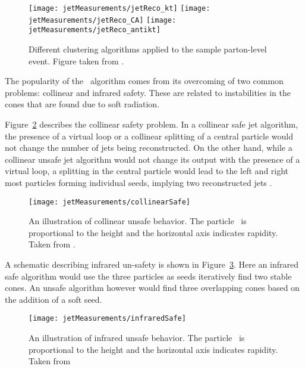 \begin{figure}[htp]
\centering
\texttt{[image: jetMeasurements/jetReco\_kt]}\hfill
\texttt{[image: jetMeasurements/jetReco\_CA]}\hfill
\texttt{[image: jetMeasurements/jetReco\_antikt]}\hfill
\caption{Different clustering algorithms applied to the sample parton-level event. Figure taken from \cite{Cacciari:2008gp}.}
\label{fig:JetClustering}
\end{figure}

The popularity of the \antikt\ algorithm comes from its overcoming of two common problems: collinear and infrared safety. These are related to instabilities in the cones that are found due to soft radiation. 

Figure~\ref{fig:collinearSafe} describes the collinear safety problem. In a collinear safe jet algorithm, the presence of a virtual loop or a collinear splitting of a central particle would not change the number of jets being reconstructed. On the other hand, while a collinear unsafe jet algorithm would not change its output with the presence of a virtual loop, a splitting in the central particle would lead to the left and right most particles forming individual seeds, implying two reconstructed jets \cite{Salam:2009jx}.

\begin{figure}[htp]
\centering
\texttt{[image: jetMeasurements/collinearSafe]}
\caption{An illustration of collinear unsafe behavior. The particle \pt\ is proportional to the height and the horizontal axis indicates rapidity. Taken from \cite{Salam:2009jx}. }
\label{fig:collinearSafe}
\end{figure}


A schematic describing infrared un-safety is shown in Figure~\ref{fig:infraredSafe}. Here an infrared safe algorithm would use the three particles as seeds iteratively find two stable cones. An unsafe algorithm however would find three overlapping cones based on the addition of a soft seed.

\begin{figure}[htp]
\centering
\texttt{[image: jetMeasurements/infraredSafe]}
\caption{An illustration of infrared unsafe behavior. The particle \pt\ is proportional to the height and the horizontal axis indicates rapidity. Taken from \cite{Salam_2007} }
\label{fig:infraredSafe}
\end{figure}


